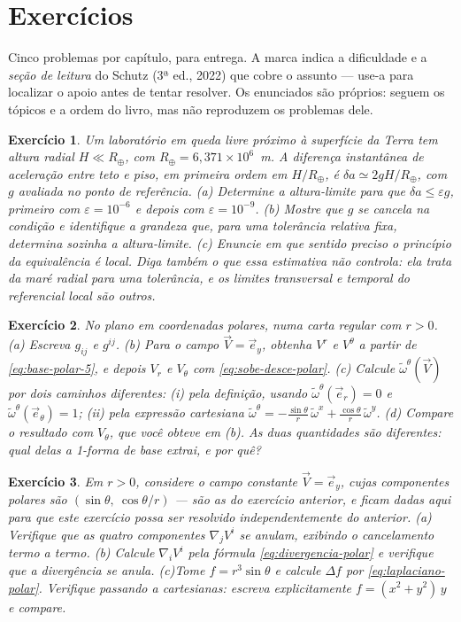 \documentclass[12pt,a4paper,oneside]{book}
\theoremstyle{rgplain}
\newtheorem{exercise}{Exercício}[chapter]
\theoremstyle{rgremark}
\begin{document}
\clearpage
\section{Exercícios}
\begin{leitura}
Cinco problemas por capítulo, para entrega. A marca indica a dificuldade e a \emph{seção de leitura} do Schutz (3ª ed., 2022) que cobre o assunto --- use-a para localizar o apoio antes de tentar resolver. Os enunciados são próprios: seguem os tópicos e a ordem do livro, mas não reproduzem os problemas dele.
\end{leitura}

\begin{exercise}
Um laboratório em queda livre próximo à superfície da Terra tem altura
\emph{radial} $H\ll R_\oplus$, com $R_\oplus=6{,}371\times10^{6}$~m. A
diferença instantânea de aceleração entre teto e piso, em primeira ordem em
$H/R_\oplus$, é $\delta a\simeq 2gH/R_\oplus$, com $g$ avaliada no ponto de
referência.
(a) Determine a altura-limite para que $\delta a\le\varepsilon g$, primeiro com
$\varepsilon=10^{-6}$ e depois com $\varepsilon=10^{-9}$.
(b) Mostre que $g$ se cancela na condição e identifique a grandeza que, para
uma tolerância relativa fixa, determina sozinha a altura-limite.
(c) Enuncie em que sentido preciso o princípio da equivalência é local. Diga
também o que essa estimativa \emph{não} controla: ela trata da maré radial para
uma tolerância, e os limites transversal e temporal do referencial local são
outros.
\end{exercise}

\begin{exercise}
No plano em coordenadas polares, numa carta regular com $r>0$.
(a) Escreva $g_{ij}$ e $g^{ij}$.
(b) Para o campo $\vec V=\vec e_y$, obtenha $V^r$ e $V^\theta$ a partir de
\eqref{eq:base-polar-5}, e depois $V_r$ e $V_\theta$ com
\eqref{eq:sobe-desce-polar}.
(c) Calcule $\tilde\omega^\theta(\vec V)$ por dois caminhos \emph{diferentes}:
(i) pela definição, usando $\tilde\omega^\theta(\vec e_r)=0$ e
$\tilde\omega^\theta(\vec e_\theta)=1$; (ii) pela expressão cartesiana
$\tilde\omega^\theta
=-\frac{\sin\theta}{r}\,\tilde\omega^x+\frac{\cos\theta}{r}\,\tilde\omega^y$.
(d) Compare o resultado com $V_\theta$, que você obteve em (b). As duas
quantidades são diferentes: qual delas a 1-forma de base extrai, e por quê?
\end{exercise}

\begin{exercise}
Em $r>0$, considere o campo constante $\vec V=\vec e_y$, cujas componentes
polares são $(\sin\theta,\ \cos\theta/r)$ --- são as do exercício anterior, e
ficam dadas aqui para que este exercício possa ser resolvido
independentemente do anterior.
(a) Verifique que as quatro componentes $\nabla_jV^i$ se anulam, exibindo o
cancelamento termo a termo.
(b) Calcule $\nabla_iV^i$ pela fórmula \eqref{eq:divergencia-polar} e verifique
que a divergência se anula.
(c)\label{ex:lap-angular} Tome $f=r^3\sin\theta$ e calcule $\Delta f$ por
\eqref{eq:laplaciano-polar}. Verifique passando a cartesianas: escreva
explicitamente $f=(x^2+y^2)\,y$ e compare.
\end{exercise}
\end{document}
